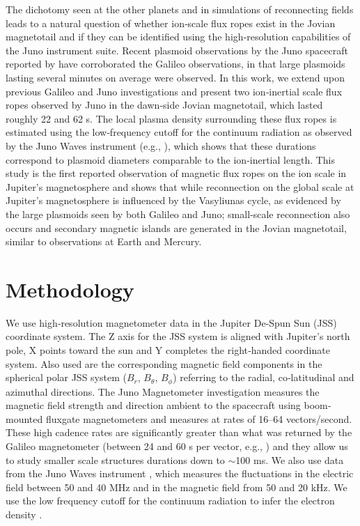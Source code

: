 The dichotomy seen at the other planets and in simulations of reconnecting fields leads to a natural question of whether ion‐scale flux ropes exist in the Jovian magnetotail and if they can be identified using the high‐resolution capabilities of the Juno instrument suite. Recent plasmoid observations by the Juno spacecraft reported by \cite{Vogt2020MagnetotailObservations} have corroborated the Galileo observations, in that large plasmoids lasting several minutes on average were observed. In this work, we extend upon previous Galileo and Juno investigations and present two ion‐inertial scale flux ropes observed by Juno in the dawn‐side Jovian magnetotail, which lasted roughly 22 and 62 s. The local plasma density surrounding these flux ropes is estimated using the low‐frequency cutoff for the continuum radiation as observed by the Juno Waves instrument (e.g., ), which shows that these durations correspond to plasmoid diameters comparable to the ion‐inertial length. This study is the first reported observation of magnetic flux ropes on the ion scale in Jupiter's magnetosphere and shows that while reconnection on the global scale at Jupiter's magnetosphere is influenced by the Vasyliunas cycle, as evidenced by the large plasmoids seen by both Galileo and Juno; small‐scale reconnection also occurs and secondary magnetic islands are generated in the Jovian magnetotail, similar to observations at Earth and Mercury. 

\section{Methodology}
We use high‐resolution magnetometer data in the Jupiter De‐Spun Sun (JSS) coordinate system. The Z axis for the JSS system is aligned with Jupiter's north pole, X points toward the sun and Y completes the right‐handed coordinate system. Also used are the corresponding magnetic field components in the spherical polar JSS system ($B_r$, $B_\theta$, $B_\phi$) referring to the radial, co‐latitudinal and azimuthal directions. The Juno Magnetometer investigation measures the magnetic field strength and direction ambient to the spacecraft using boom‐mounted fluxgate magnetometers \cite{Connerney2017TheInvestigation} and measures at rates of 16–64 vectors/second. These high cadence rates are significantly greater than what was returned by the Galileo magnetometer (between 24 and 60 s per vector, e.g., ) and they allow us to study smaller scale structures durations down to $\sim$100 ms. We also use data from the Juno Waves instrument \cite{Kurth2017TheInvestigation}, which measures the fluctuations in the electric field between 50 and 40 MHz and in the magnetic field from 50 and 20 kHz. We use the low frequency cutoff for the continuum radiation to infer the electron density \cite{Barnhart2009ElectronSpectra}. 

